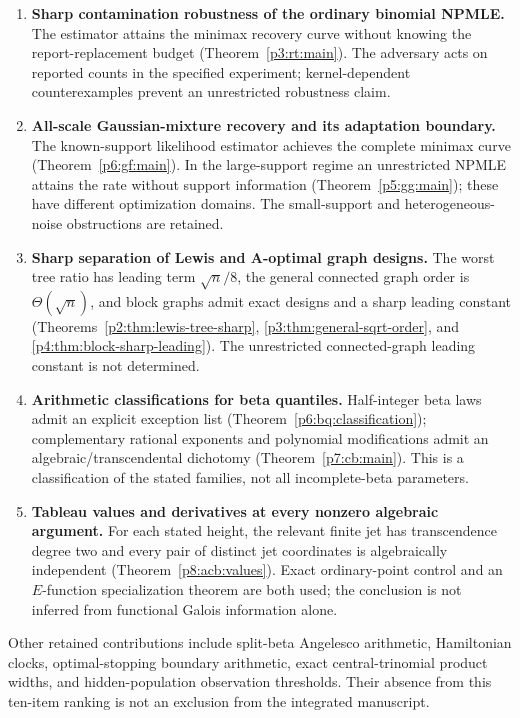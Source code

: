 \documentclass[11pt,a4paper]{article}
\theoremstyle{definition}
\theoremstyle{remark}
\numberwithin{equation}{section}
\begin{document}
\begin{enumerate}[leftmargin=*,itemsep=9pt]
\newpage
\item \textbf{Sharp contamination robustness of the ordinary binomial NPMLE.}
The estimator attains the minimax recovery curve without knowing the
report-replacement budget (Theorem~\ref{p3:rt:main}). The adversary acts
on reported counts in the specified experiment; kernel-dependent
counterexamples prevent an unrestricted robustness claim.

\item \textbf{All-scale Gaussian-mixture recovery and its adaptation boundary.}
The known-support likelihood estimator achieves the complete minimax
curve (Theorem~\ref{p6:gf:main}). In the large-support regime an
unrestricted NPMLE attains the rate without support information
(Theorem~\ref{p5:gg:main}); these have different optimization domains.
The small-support and heterogeneous-noise obstructions are retained.

\item \textbf{Sharp separation of Lewis and A-optimal graph designs.}
The worst tree ratio has leading term $\sqrt n/8$, the general connected
graph order is $\Theta(\sqrt n)$, and block graphs admit exact designs
and a sharp leading constant (Theorems~\ref{p2:thm:lewis-tree-sharp},
\ref{p3:thm:general-sqrt-order}, and \ref{p4:thm:block-sharp-leading}).
The unrestricted connected-graph leading constant is not determined.

\item \textbf{Arithmetic classifications for beta quantiles.}
Half-integer beta laws admit an explicit exception list
(Theorem~\ref{p6:bq:classification}); complementary rational exponents
and polynomial modifications admit an algebraic/transcendental
dichotomy (Theorem~\ref{p7:cb:main}). This is a classification of the
stated families, not all incomplete-beta parameters.

\item \textbf{Tableau values and derivatives at every nonzero algebraic argument.}
For each stated height, the relevant finite jet has transcendence degree
two and every pair of distinct jet coordinates is algebraically
independent (Theorem~\ref{p8:acb:values}). Exact ordinary-point control
and an $E$-function specialization theorem are both used; the conclusion
is not inferred from functional Galois information alone.
\end{enumerate}

Other retained contributions include split-beta Angelesco arithmetic,
Hamiltonian clocks, optimal-stopping boundary arithmetic, exact
central-trinomial product widths, and hidden-population observation
thresholds. Their absence from this ten-item ranking is not an exclusion
from the integrated manuscript.
\end{document}
